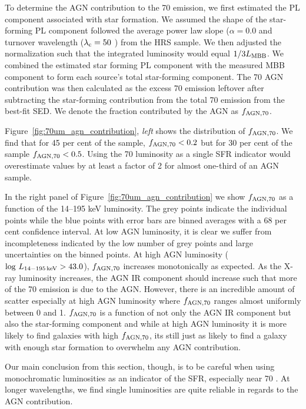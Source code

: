 \documentclass[fleqn, usenatbib]{mnras}
\begin{document}
To determine the AGN contribution to the 70 \micron{} emission, we first estimated the PL component associated with star formation. We assumed the shape of the star-forming PL component followed the average power law slope ($\alpha=0.0$ and turnover wavelength ($\lambda_{\rm c} = 50$ \micron) from the HRS sample. We then adjusted the normalization such that the integrated luminosity would equal $1/3L_{\rm MBB}$. We combined the estimated star forming PL component with the measured MBB component to form each source's total star-forming component. The 70 \micron{} AGN contribution was then calculated as the excess 70 \micron{} emission leftover after subtracting the star-forming contribution from the total 70 \micron{} emission from the best-fit SED. We denote the fraction contributed by the AGN as $f_{\rm AGN, 70}$.

Figure~\ref{fig:70um_agn_contribution}, \textit{left} shows the distribution of $f_{\rm AGN, 70}$. We find that for 45 per cent of the sample,  $f_{\rm AGN, 70} < 0.2$ but for 30 per cent of the sample $f_{\rm AGN, 70} < 0.5$. Using the 70 \micron{} luminosity as a single SFR indicator would overestimate values by at least a factor of 2 for almost one-third of an AGN sample. 

In the right panel of Figure~\ref{fig:70um_agn_contribution} we show $f_{\rm AGN, 70}$ as a function of the 14--195 keV luminosity. The grey points indicate the individual points while the blue points with error bars are binned averages with a 68 per cent confidence interval. At low AGN luminosity, it is clear we suffer from incompleteness indicated by the low number of grey points and large uncertainties on the binned points. At high AGN luminosity ($\log\,L_{\rm 14-195\,keV} > 43.0$), $f_{\rm AGN, 70}$ increases monotonically as expected. As the X-ray luminosity increases, the AGN IR component should increase such that more of the 70 \micron{} emission is due to the AGN. However, there is an incredible amount of scatter especially at high AGN luminosity where $f_{\rm AGN, 70}$ ranges almost uniformly between 0 and 1. $f_{\rm AGN, 70}$ is a function of not only the AGN IR component but also the star-forming component and while at high AGN luminosity it is more likely to find galaxies with high $f_{\rm AGN, 70}$, its still just as likely to find a galaxy with enough star formation to overwhelm any AGN contribution.

Our main conclusion from this section, though, is to be careful when using monochromatic luminosities as an indicator of the SFR, especially near 70 \micron. At longer wavelengths, we find single luminosities are quite reliable in regards to the AGN contribution.
\end{document}
